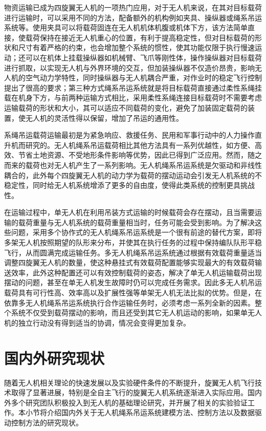 \documentclass[lang=chs, degree=master, blindreview=false, winfonts=true]{yanputhesis}
\begin{document}
物资运输已成为四旋翼无人机的一项热门应用\cite{cruz2014autonomous}，对于无人机来说，在其对目标载荷进行运输时，可以采用不同的方法，配备额外的机构例如夹具、操纵器或绳系吊运系统等。使用夹具可以将载荷固连在无人机机体机腹或机体下方，该方法简单直接，使载荷保持在接近无人机重心的位置，有利于提高稳定性，但对目标载荷的形状和尺寸有着严格的约束，也会增加整个系统的惯性，使其功能仅限于执行慢速运动\cite{Khalifa2017}；还可以在机体上挂载操纵器如机械臂、飞爪等刚性体，操作操纵器对目标载荷进行抓取，以实现无人机与外界环境的交互，但加装操纵器不仅造价昂贵，影响无人机的空气动力学特性，同时操纵器与无人机耦合严重，对作业时的稳定飞行控制提出了很高的要求；第三种方式绳系吊运系统就是将目标载荷直接通过柔性系绳挂载在机身下方，与前两种运输方式相比，采用柔性系绳连接目标载荷时不需要考虑运输载荷的形状和大小，其可以适应不同载荷的变化，避免了加装固定载荷的装置，使无人机的灵活性得以保留，增加了吊运的通用性。

系绳吊运载荷运输最初是为紧急响应、救援任务、民用和军事行动中的人力操作直升机而研究的\cite{2020A}。无人机绳系吊运载荷相比其他方法具有一系列优越性，如方便、高效、节省土地资源、不受地形条件影响等优势，因此已得到广泛应用。然而，随之而来的载荷也对无人机产生了一系列影响。无人机绳系吊运系统是欠驱动和非线性耦合的，此外每个四旋翼无人机的动力学为载荷的摆动运动会引发无人机系统的不稳定性，同时给无人机系统增添了更多的自由度，使得此类系统的控制更具挑战性。

在运输过程中，单无人机在利用吊装方式运输的时候载荷会存在摆动，且当需要运输的载荷重量与无人机系统的载荷重量相当时，任务可能会受到影响。为了解决这些问题，采用多个协作式的无人机绳系吊运系统是一个很有前途的替代方案，即将多架无人机按照期望的队形来分布，并使其在执行任务的过程中保持编队队形平稳飞行，从而圆满完成运输任务。多无人机绳系吊运系统通过根据有效载荷重量适当调整四旋翼无人机的数量，使这种悬挂式有效载荷配置能够实现最大的有效载荷输送效率，此外这种配置还可以有效控制载荷的姿态，解决了单无人机运输载荷出现摆动的问题，甚至在单无人机发生故障时仍可以完成任务需求。因此多无人机吊运载荷具有可行性高、效率高以及扩展性强等单架无人机无法比拟的优势。但是，在依靠多无人机绳系吊运系统执行合作运输任务时，必须考虑一系列全新的因素。整个系统不仅受到载荷摆动的影响，而且还受到其它无人机运动的影响，如果单无人机的独立行动没有得到适当的协调，情况会变得更加复杂。


\section{国内外研究现状}
随着无人机相关理论的快速发展以及实验硬件条件的不断提升，旋翼无人机飞行技术取得了显著进展，特别是全自主飞行的旋翼无人机系统逐渐进入实际应用。国内外多个研究团队积极投入到无人机的基础理论研究，并开展了相关的实验验证工作。本小节将介绍国内外关于无人机绳系吊运系统建模方法、控制方法以及数据驱动控制方法的研究现状。
\end{document}
